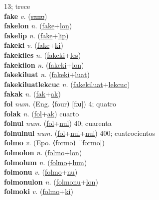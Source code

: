 13; trece \label{fak} \\
\textbf{fake} \textit{v.} (\hyperref[sano]{\sout{sano}})
 \label{fake} \\
\textbf{fakelon} \textit{n.} (\hyperref[fake]{fake}+\hyperref[lon]{lon})
 \label{fakelon} \\
\textbf{fakelip} \textit{n.} (\hyperref[fake]{fake}+\hyperref[lip]{lip})
 \label{fakelip} \\
\textbf{fakeki} \textit{v.} (\hyperref[fake]{fake}+\hyperref[ki]{ki})
 \label{fakeki} \\
\textbf{fakekiles} \textit{n.} (\hyperref[fakeki]{fakeki}+\hyperref[les]{les})
 \label{fakekiles} \\
\textbf{fakekilon} \textit{n.} (\hyperref[fakeki]{fakeki}+\hyperref[lon]{lon})
 \label{fakekilon} \\
\textbf{fakekiluat} \textit{n.} (\hyperref[fakeki]{fakeki}+\hyperref[luat]{luat})
 \label{fakekiluat} \\
\textbf{fakekiluatlekcuc} \textit{n.} (\hyperref[fakekiluat]{fakekiluat}+\hyperref[lekcuc]{lekcuc})
 \label{fakekiluatlekcuc} \\
\textbf{fakak} \textit{n.} (\hyperref[fak]{fak}+\hyperref[ak]{ak})
 \label{fakak} \\
\textbf{fol} \textit{num.} (Eng. ⟨four⟩ [fɔɹ])
4; quatro \label{fol} \\
\textbf{folak} \textit{n.} (\hyperref[fol]{fol}+\hyperref[ak]{ak})
cuarto \label{folak} \\
\textbf{folnul} \textit{num.} (\hyperref[fol]{fol}+\hyperref[nul]{nul})
40; cuarenta \label{folnul} \\
\textbf{folnulnul} \textit{num.} (\hyperref[fol]{fol}+\hyperref[nul]{nul}+\hyperref[nul]{nul})
400; cuatrocientos \label{folnulnul} \\
\textbf{folmo} \textit{v.} (Epo. ⟨formo⟩ [ˈformo])
 \label{folmo} \\
\textbf{folmolon} \textit{n.} (\hyperref[folmo]{folmo}+\hyperref[lon]{lon})
 \label{folmolon} \\
\textbf{folmolum} \textit{n.} (\hyperref[folmo]{folmo}+\hyperref[lum]{lum})
 \label{folmolum} \\
\textbf{folmonu} \textit{v.} (\hyperref[folmo]{folmo}+\hyperref[nu]{nu})
 \label{folmonu} \\
\textbf{folmonulon} \textit{n.} (\hyperref[folmonu]{folmonu}+\hyperref[lon]{lon})
 \label{folmonulon} \\
\textbf{folmoki} \textit{v.} (\hyperref[folmo]{folmo}+\hyperref[ki]{ki})
 \label{folmoki} \\
